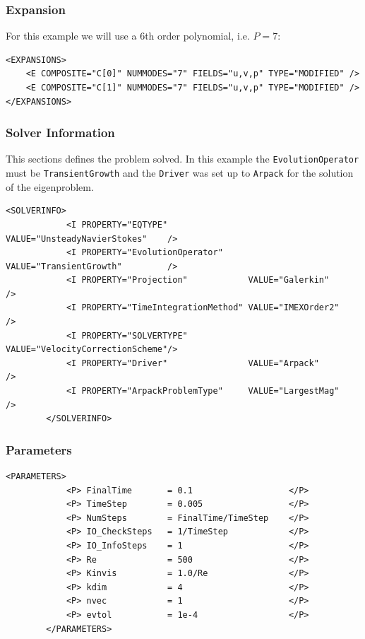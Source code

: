 \subsubsection{Expansion}

For this example we will use a 6th order polynomial, i.e. $P=7$:

      \begin{lstlisting}[style=XMLStyle]
<EXPANSIONS>
    <E COMPOSITE="C[0]" NUMMODES="7" FIELDS="u,v,p" TYPE="MODIFIED" />
    <E COMPOSITE="C[1]" NUMMODES="7" FIELDS="u,v,p" TYPE="MODIFIED" />
</EXPANSIONS> 
        \end{lstlisting}

\subsubsection{Solver Information}

This sections defines the problem solved. In this example the \texttt{EvolutionOperator} must be \texttt{TransientGrowth} and the \texttt{Driver} was set up to \texttt{Arpack} for the solution of the eigenproblem. 

      \begin{lstlisting}[style=XMLStyle]
 <SOLVERINFO>
            <I PROPERTY="EQTYPE"                VALUE="UnsteadyNavierStokes"    />
            <I PROPERTY="EvolutionOperator"     VALUE="TransientGrowth"         />
            <I PROPERTY="Projection"            VALUE="Galerkin"                />
            <I PROPERTY="TimeIntegrationMethod" VALUE="IMEXOrder2"              />
            <I PROPERTY="SOLVERTYPE"            VALUE="VelocityCorrectionScheme"/>
            <I PROPERTY="Driver"                VALUE="Arpack"                  />
            <I PROPERTY="ArpackProblemType"     VALUE="LargestMag"              />
        </SOLVERINFO>
                \end{lstlisting}


\subsubsection{Parameters}

      \begin{lstlisting}[style=XMLStyle]
<PARAMETERS>
            <P> FinalTime       = 0.1                   </P>
            <P> TimeStep        = 0.005                 </P>
            <P> NumSteps        = FinalTime/TimeStep    </P>
            <P> IO_CheckSteps   = 1/TimeStep            </P>
            <P> IO_InfoSteps    = 1                     </P>
            <P> Re              = 500                   </P>
            <P> Kinvis          = 1.0/Re                </P>
            <P> kdim            = 4                     </P>
            <P> nvec            = 1                     </P>
            <P> evtol           = 1e-4                  </P>
        </PARAMETERS>
                        \end{lstlisting}
                        
